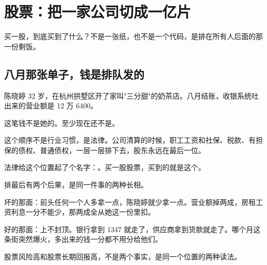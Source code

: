 \chapter{股票：把一家公司切成一亿片}

\begin{ledetext}
买一股，到底买到了什么？不是一张纸，也不是一个代码，是排在所有人后面的那一份剩饭。
\end{ledetext}

\section{八月那张单子，钱是排队发的}

陈晓婷 32 岁，在杭州拱墅区开了家叫"三分甜"的奶茶店。八月结账，收银系统吐出来的营业额是 12 万 6400。

这笔钱不是她的。至少现在还不是。

\begin{flowlist}
\end{flowlist}

这个顺序不是行业习惯，是法律。公司清算的时候，职工工资和社保、税款、有担保的债权、普通债权，一层一层排下去，股东永远在最后一位。

法律给这个位置起了个名字：。买一股股票，买到的就是这个。

排最后有两个后果，是同一件事的两种长相。

坏的那面：前头任何一个人多拿一点，陈晓婷就少拿一点。营业额掉两成，房租工资利息一分不能少，那两成全从她这一份里扣。

好的那面：上不封顶。银行拿到 1347 就走了，供应商拿到货款就走了。哪个月这条街突然爆火，多出来的钱一分都不用分给他们。

\begin{pullquote}{}
股票风险高和股票长期回报高，不是两个事实，是同一个位置的两种读法。
\end{pullquote}

